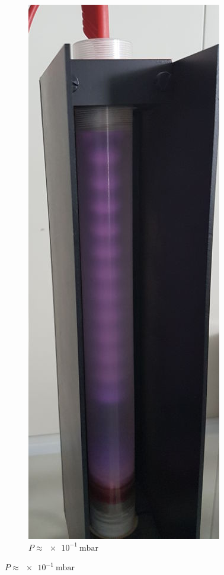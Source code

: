 \begin{figure}[b!]
	\centering
	\begin{subfigure}{.3\linewidth}
		\centering
		\includegraphics[width=.7\linewidth,]{img/discharge-1.jpg}
		\caption{$P \approx \SI{e-1}{\milli\bar}$}
	\end{subfigure}

\end{figure}
